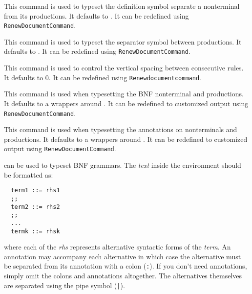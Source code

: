 \documentclass[a4paper]{article}
\begin{document}
\begin{presentcommand}
\end{presentcommand}
This command is used to typeset the definition symbol separate a nonterminal from its productions. It defaults to \SimpleBNFDefEq. It can be redefined using \verb|RenewDocumentCommand|.

\begin{presentcommand}
\end{presentcommand}
This command is used to typeset the separator symbol between productions. It defaults to \SimpleBNFDefOr. It can be redefined using \verb|RenewDocumentCommand|.

\begin{presentcommand}
\end{presentcommand}
This command is used to control the vertical spacing between consecutive rules.
It defaults to 0.
It can be redefined using \verb/Renewdocumentcommand/.

\begin{presentcommand}
\end{presentcommand}
This command is used when typesetting the BNF nonterminal and productions. It defaults to a wrappers around . It can be redefined to customized output using \verb|RenewDocumentCommand|.

\begin{presentcommand}
\end{presentcommand}
This command is used when typesetting the annotations on nonterminals and productions. It defaults to a wrappers around . It can be redefined to customized output using \verb|RenewDocumentCommand|.

\begin{presentcommand}
\end{presentcommand}
can be used to typeset BNF grammars. The \textit{text} inside the environment should be formatted as:
\begin{verbatim}
  term1 ::= rhs1
  ;;
  term2 ::= rhs2
  ;;
  ...
  termk ::= rhsk
\end{verbatim}
where each of the \textit{rhs} represents alternative syntactic forms of the \textit{term}. An annotation may accompany each alternative in which case the alternative must be separated from its annotation with a colon (\verb/:/). If you don't need annotations, simply omit the colons and annotations altogether. The alternatives themselves are separated using the pipe symbol (\verb/|/).
\end{document}
